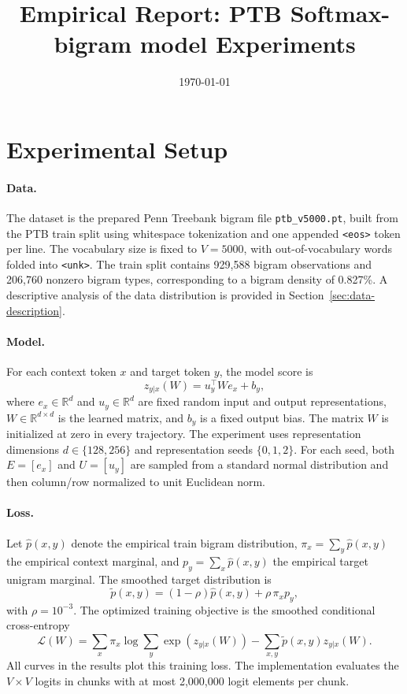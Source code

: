 \documentclass[11pt]{article}
\title{Empirical Report: PTB Softmax-bigram model Experiments}
\author{}
\date{\today}
\begin{document}
\maketitle

\section{Experimental Setup}

\paragraph{Data.}
The dataset is the prepared Penn Treebank bigram file \texttt{ptb\_v5000.pt}, built from the PTB train split using whitespace tokenization and one appended \texttt{<eos>} token per line. The vocabulary size is fixed to \(V=5000\), with out-of-vocabulary words folded into \texttt{<unk>}. The train split contains 929,588 bigram observations and 206,760 nonzero bigram types, corresponding to a bigram density of 0.827\%. A descriptive analysis of the data distribution is provided in Section~\ref{sec:data-description}.

\paragraph{Model.}
For each context token \(x\) and target token \(y\), the model score is
\begin{equation}
z_{y|x}(W) = u_y^\top W e_x + b_y,
\end{equation}
where \(e_x \in \mathbb{R}^d\) and \(u_y \in \mathbb{R}^d\) are fixed random input and output representations, \(W \in \mathbb{R}^{d \times d}\) is the learned matrix, and \(b_y\) is a fixed output bias. The matrix \(W\) is initialized at zero in every trajectory. The experiment uses representation dimensions \(d \in \{128,256\}\) and representation seeds \(\{0,1,2\}\). For each seed, both \(E=[e_x]\) and \(U=[u_y]\) are sampled from a standard normal distribution and then column/row normalized to unit Euclidean norm.

\paragraph{Loss.}
Let \(\widehat p(x,y)\) denote the empirical train bigram distribution, \(\pi_x=\sum_y \widehat p(x,y)\) the empirical context marginal, and \(p_y=\sum_x \widehat p(x,y)\) the empirical target unigram marginal. The smoothed target distribution is
\begin{equation}
\widetilde p(x,y) = (1-\rho)\widehat p(x,y) + \rho\,\pi_x p_y,
\end{equation}
with \(\rho=10^{-3}\). The optimized training objective is the smoothed conditional cross-entropy
\begin{equation}
\mathcal{L}(W)
= \sum_x \pi_x \log\sum_y \exp(z_{y|x}(W))
- \sum_{x,y}\widetilde p(x,y)z_{y|x}(W).
\end{equation}
All curves in the results plot this training loss. The implementation evaluates the \(V \times V\) logits in chunks with at most 2,000,000 logit elements per chunk.
\end{document}
